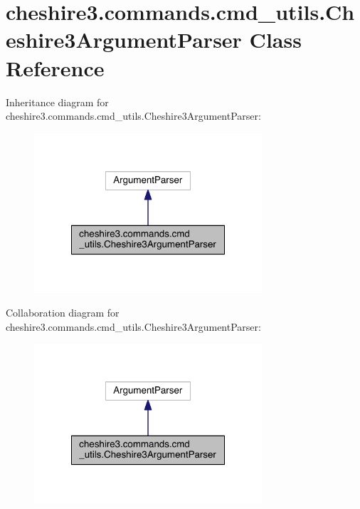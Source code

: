 \hypertarget{classcheshire3_1_1commands_1_1cmd__utils_1_1_cheshire3_argument_parser}{\section{cheshire3.\-commands.\-cmd\-\_\-utils.\-Cheshire3\-Argument\-Parser Class Reference}
\label{classcheshire3_1_1commands_1_1cmd__utils_1_1_cheshire3_argument_parser}
}


Inheritance diagram for cheshire3.\-commands.\-cmd\-\_\-utils.\-Cheshire3\-Argument\-Parser\-:
\nopagebreak
\begin{figure}[H]
\begin{center}
\leavevmode
\includegraphics[width=240pt]{classcheshire3_1_1commands_1_1cmd__utils_1_1_cheshire3_argument_parser__inherit__graph}
\end{center}
\end{figure}


Collaboration diagram for cheshire3.\-commands.\-cmd\-\_\-utils.\-Cheshire3\-Argument\-Parser\-:
\nopagebreak
\begin{figure}[H]
\begin{center}
\leavevmode
\includegraphics[width=240pt]{classcheshire3_1_1commands_1_1cmd__utils_1_1_cheshire3_argument_parser__coll__graph}
\end{center}
\end{figure}
